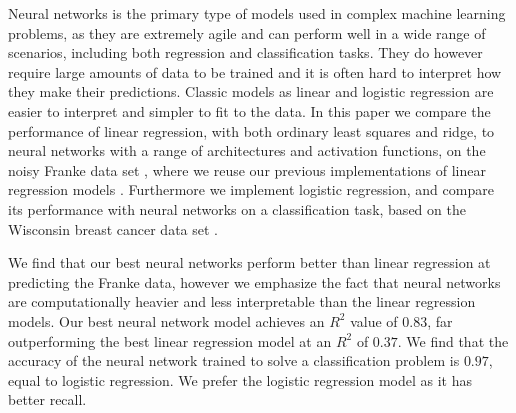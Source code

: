 Neural networks is the primary type of models used in complex machine learning problems, as they are extremely agile and can perform well in a wide range of scenarios, including both regression and classification tasks.
They do however require large amounts of data to be trained and it is often hard to interpret how they make their predictions.
Classic models as linear and logistic regression are easier to interpret and simpler to fit to the data.
In this paper we compare the performance of linear regression, with both ordinary least squares and ridge, to neural networks with a range of architectures and activation functions, on the noisy Franke data set \cite{frank}, where we reuse our previous implementations of linear regression models \cite{project1}.
Furthermore we implement logistic regression, and compare its performance with neural networks on a classification task, based on the Wisconsin breast cancer data set \cite{breast_cancer_wisconsin}.

We find that our best neural networks perform better than linear regression at predicting the Franke data, however we emphasize the fact that neural networks are computationally heavier and less interpretable than the linear regression models.
Our best neural network model achieves an $R^2$ value of $0.83$, far outperforming the best linear regression model at an $R^2$ of $0.37$.
We find that the accuracy of the neural network trained to solve a classification problem is $0.97$, equal to logistic regression. We prefer the logistic regression model as it has better recall.


